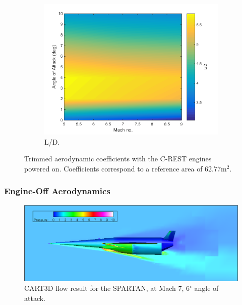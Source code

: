 \begin{figure}[ht]
\begin{subfigure}{.5\textwidth}
				\includegraphics[width=0.99\linewidth]{figures/3_vehicle_design/LD-EngineOn}
				\caption{L/D.}
				\label{fig:LD-EngineOn}
			\end{subfigure}
			\caption{Trimmed aerodynamic coefficients with the C-REST engines powered on. Coefficients correspond to a reference area of 62.77m$^2$. }
			\label{fig:EngineOnAero}
		\end{figure}
		

\subsubsection{Engine-Off Aerodynamics}


\begin{figure}[ht]
	\centering
	\includegraphics[width=0.9\linewidth]{figures/3_vehicle_design/M7AoA6}
	\caption{CART3D flow result for the SPARTAN, at Mach 7, 6$^\circ$ angle of attack.}
	\label{fig:M7AoA6}
\end{figure}


